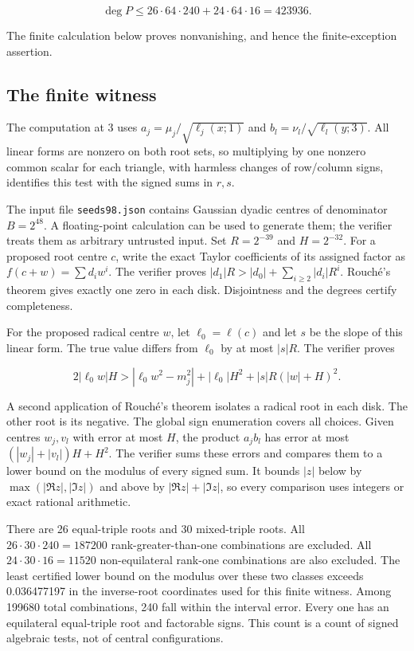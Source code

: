 \documentclass[11pt]{article}
\begin{document}
\[
\deg P \le 26\cdot64\cdot240+24\cdot64\cdot16=423936.
\]

The finite calculation below proves nonvanishing, and hence the finite-exception assertion.

\subsection*{The finite witness}

The computation at 3 uses \(a_j=\mu_j/\sqrt{\ell_j(x;1)}\) and \(b_l=\nu_l/\sqrt{\ell_l(y;3)}\). All linear forms are nonzero on both root sets, so multiplying by one nonzero common scalar for each triangle, with harmless changes of row/column signs, identifies this test with the signed sums in \(r,s\).

The input file \texttt{seeds98.json} contains Gaussian dyadic centres of denominator \(B=2^{48}\). A floating-point calculation can be used to generate them; the verifier treats them as arbitrary untrusted input. Set \(R=2^{-39}\) and \(H=2^{-32}\). For a proposed root centre \(c\), write the exact Taylor coefficients of its assigned factor as \(f(c+w)=\sum d_i w^i\). The verifier proves \(|d_1|R>|d_0|+\sum_{i\ge2}|d_i|R^i\). Rouché's theorem gives exactly one zero in each disk. Disjointness and the degrees certify completeness.

For the proposed radical centre \(w\), let \(\ell_0=\ell(c)\) and let \(s\) be the slope of this linear form. The true value differs from \(\ell_0\) by at most \(|s|R\). The verifier proves

\[
2|\ell_0w|H>
|\ell_0w^2-m_j^2|+|\ell_0|H^2+|s|R(|w|+H)^2.
\]

A second application of Rouché's theorem isolates a radical root in each disk. The other root is its negative. The global sign enumeration covers all choices. Given centres \(w_j,v_l\) with error at most \(H\), the product \(a_jb_l\) has error at most \((|w_j|+|v_l|)H+H^2\). The verifier sums these errors and compares them to a lower bound on the modulus of every signed sum. It bounds \(|z|\) below by \(\max(|\Re z|,|\Im z|)\) and above by \(|\Re z|+|\Im z|\), so every comparison uses integers or exact rational arithmetic.

There are 26 equal-triple roots and 30 mixed-triple roots. All \(26\cdot30\cdot240=187200\) rank-greater-than-one combinations are excluded. All \(24\cdot30\cdot16=11520\) non-equilateral rank-one combinations are also excluded. The least certified lower bound on the modulus over these two classes exceeds 0.036477197 in the inverse-root coordinates used for this finite witness. Among 199680 total combinations, 240 fall within the interval error. Every one has an equilateral equal-triple root and factorable signs. This count is a count of signed algebraic tests, not of central configurations.
\end{document}
